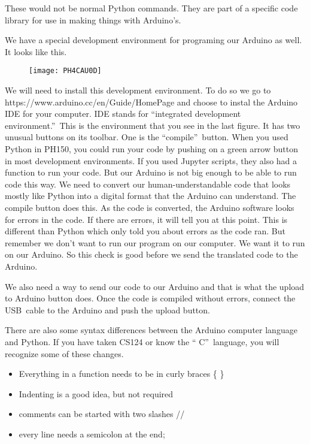 These would not be normal Python commands. They are part of a specific code
library for use in making things with Arduino's.

We have a special development environment for programing our Arduino as
well. It looks like this. \begin{figure}[h!]
\texttt{[image: PH4CAU0D]}
\end{figure}We will need to install this
development environment. To do so we go to
https://www.arduino.cc/en/Guide/HomePage and choose to instal the Arduino
IDE for your computer. IDE stands for \textquotedblleft integrated
development environment.\textquotedblright\ This is the environment that you
see in the last figure. It has two unusual buttons on its toolbar. One is
the \textquotedblleft compile\textquotedblright\ button. When you used
Python in PH150, you could run your code by pushing on a green arrow button
in most development environments. If you used Jupyter scripts, they also had
a function to run your code. But our Arduino is not big enough to be able to
run code this way. We need to convert our human-understandable code that
looks mostly like Python into a digital format that the Arduino can
understand. The compile button does this. As the code is converted, the
Arduino software looks for errors in the code. If there are errors, it will
tell you at this point. This is different than Python which only told you
about errors as the code ran. But remember we don't want to run our program
on our computer. We want it to run on our Arduino. So this check is good
before we send the translated code to the Arduino.

We also need a way to send our code to our Arduino and that is what the
upload to Arduino button does. Once the code is compiled without errors,
connect the USB\ cable to the Arduino and push the upload button.

There are also some syntax differences between the Arduino computer language
and Python. If you have taken CS124 or know the \textquotedblleft
C\textquotedblright\ language, you will recognize some of these changes.

\begin{itemize}
\item Everything in a function needs to be in curly braces \{ \}

\item Indenting is a good idea, but not required

\item comments can be started with two slashes //

\item every line needs a semicolon at the end;
\end{itemize}

